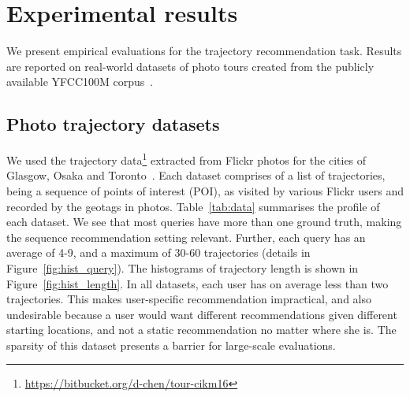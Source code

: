 
\section{Experimental results}
\label{sec:experiment}



We present empirical evaluations for the trajectory recommendation task. %
Results are reported on real-world datasets of photo tours
created from the publicly available YFCC100M corpus~\cite{thomee2016yfcc100m}.


\subsection{Photo trajectory datasets}
\label{sec:dataset}

We used the trajectory data\footnote{\url{https://bitbucket.org/d-chen/tour-cikm16}}
extracted from Flickr photos for the cities of Glasgow, Osaka and
Toronto~\cite{ijcai15,cikm16paper}.
Each dataset comprises of a
list of trajectories, being a sequence of points of interest (POI),
as visited by various Flickr users and recorded by the geotags in photos.
Table~\ref{tab:data} summarises the profile of each dataset.
We see that most queries have more than one ground truth, making the sequence recommendation setting relevant. Further, each query has an average of 4-9, and a maximum of 30-60 trajectories (details in Figure~\ref{fig:hist_query}).
The histograms of trajectory length is shown in Figure~\ref{fig:hist_length}.
In all datasets,
each user has on average less than two trajectories.
This makes user-specific recommendation impractical, and also undesirable because
a user would want different recommendations given different starting locations, and not a static recommendation no matter where she is.
The sparsity of this dataset presents a barrier for large-scale evaluations.

